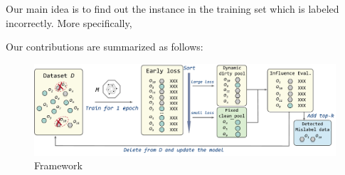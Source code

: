
Our main idea is to find out the instance in the training set which is labeled incorrectly.
More specifically, 

Our contributions are summarized as follows:


\begin{figure}
	\centering
	\includegraphics[width=\textwidth]{figures/framework}
	\caption{\sys Framework}
	\label{fig:framework}
\end{figure}


\be
	\item 
	\item 
	\item {}
\ee




